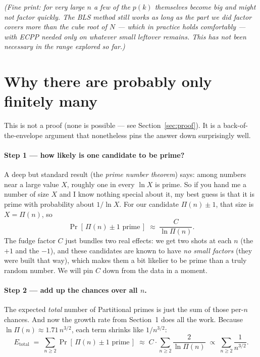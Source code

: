 \documentclass[11pt,a4paper]{article}
\newcommand{\Part}{\Pi}                 %
\begin{document}
\medskip
\noindent\emph{(Fine print: for very large $n$ a few of the $p(k)$ themselves
become big and might not factor quickly. The BLS method still works as long as
the part we \emph{did} factor covers more than the cube root of $N$ --- which in
practice holds comfortably --- with ECPP needed only on whatever small leftover
remains. This has not been necessary in the range explored so far.)}

\section{Why there are probably only finitely many}\label{sec:heuristic}

This is not a proof (none is possible --- see Section~\ref{sec:proof}). It is a
back-of-the-envelope argument that nonetheless pins the answer down surprisingly
well.

\paragraph{Step 1 --- how likely is one candidate to be prime?}
A deep but standard result (the \emph{prime number theorem}) says: among numbers
near a large value $X$, roughly one in every $\ln X$ is prime. So if you hand me
a number of size $X$ and I know nothing special about it, my best guess is that
it is prime with probability about $1/\ln X$. For our candidate $\Part(n)\pm1$,
that size is $X=\Part(n)$, so
\[
  \Pr[\,\Part(n)\pm1 \text{ prime}\,] \;\approx\; \frac{C}{\ln\Part(n)} .
\]
The fudge factor $C$ just bundles two real effects: we get two shots at each $n$
(the $+1$ and the $-1$), and these candidates are known to have \emph{no small
factors} (they were built that way), which makes them a bit likelier to be prime
than a truly random number. We will pin $C$ down from the data in a moment.

\paragraph{Step 2 --- add up the chances over all $n$.}
The expected \emph{total} number of Partitional primes is just the sum of those
per-$n$ chances. And now the growth rate from Section~1 does all the work.
Because $\ln\Part(n)\approx 1.71\,n^{3/2}$, each term shrinks like $1/n^{3/2}$:
\[
  E_{\text{total}}
  \;=\; \sum_{n\ge2}\Pr[\,\Part(n)\pm1\text{ prime}\,]
  \;\approx\; C\cdot\sum_{n\ge2}\frac{2}{\ln\Part(n)}
  \;\propto\; \sum_{n\ge2}\frac{1}{n^{3/2}}.
\]
\end{document}
